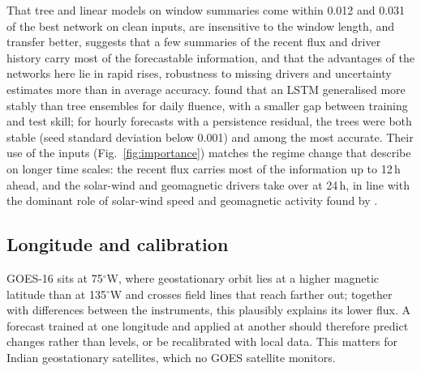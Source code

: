 \documentclass[a4paper,fleqn]{cas-dc}
\begin{document}
That tree and linear models on window summaries come within 0.012 and 0.031 of the best network on clean inputs,
are insensitive to the window length, and transfer better, suggests that a few summaries of the recent flux and driver
history carry most of the forecastable information, and that the advantages of the networks here lie in rapid
rises, robustness to missing drivers and uncertainty estimates more than in average accuracy. \citet{azragorskaya2026} found that an LSTM generalised more stably than tree ensembles for
daily fluence, with a smaller gap between training and test skill; for hourly forecasts with a persistence residual, the trees were both stable (seed standard deviation below
0.001) and among the most accurate. Their use of the inputs (Fig.~\ref{fig:importance}) matches the regime change
that \citet{azragorskaya2026} describe on longer time scales: the recent flux carries most of the information up to
12\,h ahead, and the solar-wind and geomagnetic drivers take over at 24\,h, in line with the dominant role of
solar-wind speed and geomagnetic activity found by \citet{geletaw2024}.

\subsection{Longitude and calibration}
GOES-16 sits at 75\(^\circ\)W, where geostationary orbit lies at a higher magnetic latitude than at
135\(^\circ\)W and crosses field lines that reach farther out; together with differences between the
instruments, this plausibly explains its lower flux. A forecast trained at one longitude and applied at another
should therefore predict changes rather than levels, or be recalibrated with local data. This matters for Indian
geostationary satellites, which no GOES satellite monitors.
\end{document}
